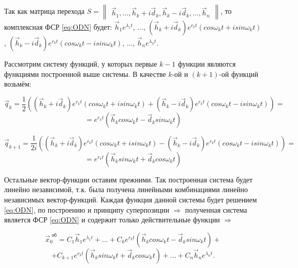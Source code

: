 Так как матрица перехода $S = \begin{Vmatrix*} \overrightarrow{h}_1, \ldots, \overrightarrow{h}_k + i \overrightarrow{d}_k, \overrightarrow{h}_k - i \overrightarrow{d}_k, \ldots, \overrightarrow{h}_n \end{Vmatrix*}$,
то комплексная ФСР \eqref{eq:ODN} будет: $\overrightarrow{h}_1 e^{\lambda_1 t}$, ..., $(\overrightarrow{h}_k + i \overrightarrow{d}_k) e^{r_k t} (cos\omega_k t + i sin \omega_k t)$, 
$(\overrightarrow{h}_k - i \overrightarrow{d}_k) e^{r_k t} (cos\omega_k t - i sin \omega_k t)$, ..., $\overrightarrow{h}_n e^{\lambda_n t}$. 

Рассмотрим систему функций, у которых первые $k-1$ функции являются функциями построенной выше системы. В качестве $k$-ой и $(k+1)$-ой функций возьмём:

\[
  \overrightarrow{q}_k = \frac{1}{2} \left((\overrightarrow{h}_k + i \overrightarrow{d}_k) e^{r_k t} (cos \omega_k t + i sin \omega_k t) + (\overrightarrow{h}_k - i \overrightarrow{d}_k) e^{r_k t} (cos \omega_k t - i sin \omega_k t) \right) = 
\]
\[
  = e^{r_k t} (\overrightarrow{h}_k cos \omega_k t - \overrightarrow{d}_k sin \omega_k t)
\]

\[
  \overrightarrow{q}_{k+1} = \frac{1}{2i} \left((\overrightarrow{h}_k + i \overrightarrow{d}_k) e^{r_k t} (cos \omega_k t + i sin \omega_k t) - (\overrightarrow{h}_k - i \overrightarrow{d}_k) e^{r_k t} (cos \omega_k t - i sin \omega_k t) \right)  = 
\]
\[
  = e^{r_k t} (\overrightarrow{h}_k sin \omega_k t + \overrightarrow{d}_k cos \omega_k t)
\]

Остальные вектор-функции оставим прежними. Так построенная система будет линейно независимой, т.к. была получена линейными комбинациями линейно независимых вектор-функций. Каждая функция данной системы будет решением \eqref{eq:ODN}, по построению и принципу суперпозиции $\Rightarrow$ полученная система является ФСР \eqref{eq:ODN} и содержит только действительные функции $\Rightarrow$

\begin{equation*}
  \overrightarrow{x}^{\text{ об}}_0 = C_1 \overrightarrow{h}_1 e^{\lambda_1 t} + ...+ C_k e^{r_k t} (\overrightarrow{h}_k cos \omega_k t - \overrightarrow{d}_k sin \omega_k t) +
\end{equation*}
\begin{equation*}
  + C_{k+1} e^{r_k t} (\overrightarrow{h}_k sin \omega_k t + \overrightarrow{d}_k cos \omega_k t) + ... + C_n \overrightarrow{h}_n e^{\lambda_n t}.
\end{equation*}

